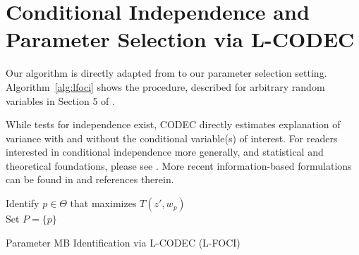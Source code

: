 \section{Conditional Independence and Parameter Selection via L-CODEC}
Our algorithm is directly adapted from \cite{codec} to our parameter selection setting. Algorithm~\ref{alg:lfoci} shows the procedure, described for arbitrary random variables in Section 5 of \cite{codec}. 

While tests for independence exist, CODEC directly estimates explanation of variance with and without the conditional variable(s) of interest. For readers interested in conditional independence more generally, and statistical and theoretical foundations, please see \cite{spirtes2000causation, dawid1979conditional}. More recent information-based formulations can be found in \cite{bullseye} and references therein.

\begin{algorithm}
\SetAlgoLined
{}
Identify $p \in \Theta$ that maximizes $T(z',w_p)$ \\
Set $P = \{p\}$ \\
 \caption{\label{alg:lfoci} Parameter MB Identification via L-CODEC (L-FOCI)}
\end{algorithm}